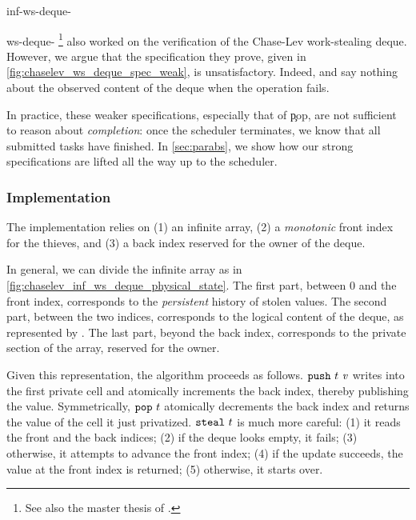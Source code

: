 \begin{tirPrefix}{inf-ws-deque-}
\begin{tirPrefix}{ws-deque-}
%
\footnote{
See also the master thesis of \citet{DBLP:journals/corr/abs-2309-03642}.
}
also worked on the verification of the Chase-Lev work-stealing deque.
However, we argue that the specification they prove, given in \cref{fig:chaselev_ws_deque_spec_weak}, is unsatisfactory.
Indeed,  and  say nothing about the observed content of the deque when the operation fails.

In practice, these weaker specifications, especially that of \c{pop}, are not sufficient to reason about \emph{completion}: once the scheduler terminates, we know that all submitted tasks have finished.
In \cref{sec:parabs}, we show how our strong specifications are lifted all the way up to the scheduler.


\end{tirPrefix}

\subsubsection{Implementation}



The implementation relies on
(1) an infinite array,
(2) a \emph{monotonic} front index for the thieves, and
(3) a back index reserved for the owner of the deque.

In general, we can divide the infinite array as in \cref{fig:chaselev_inf_ws_deque_physical_state}.
The first part, between 0 and the front index, corresponds to the \emph{persistent} history of stolen values.
The second part, between the two indices, corresponds to the logical content of the deque, as represented by \model.
The last part, beyond the back index, corresponds to the private section of the array, reserved for the owner.

Given this representation, the algorithm proceeds as follows.
$\c{push}\ t\ \zooVal$ writes \zooVal into the first private cell and atomically increments the back index, thereby publishing the value.
Symmetrically, $\c{pop}\ t$ atomically decrements the back index and returns the value of the cell it just privatized.
$\c{steal}\ t$ is much more careful:
(1) it reads the front and the back indices;
(2) if the deque looks empty, it fails;
(3) otherwise, it attempts to advance the front index;
(4) if the update succeeds, the value at the front index is returned;
(5) otherwise, it starts over.


\end{tirPrefix}
